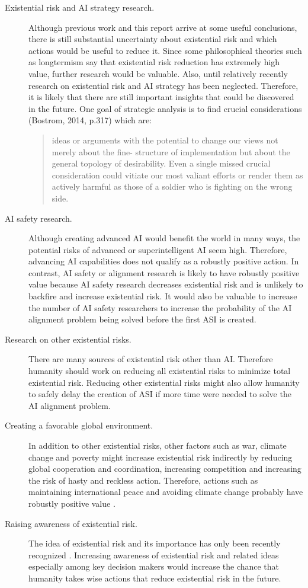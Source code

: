 \documentclass{article}
\begin{document}
\begin{description}
\item[Existential risk and AI strategy research.] Although previous work and this report arrive at some useful conclusions, there is still substantial uncertainty about existential risk and which actions would be useful to reduce it. Since some philosophical theories such as longtermism say that existential risk reduction has extremely high value, further research would be valuable. Also, until relatively recently research on existential risk and AI strategy has been neglected. Therefore, it is likely that there are still important insights that could be discovered in the future. One goal of strategic analysis is to find crucial considerations (Bostrom, 2014, p.317) which are:
\begin{quote}
ideas or arguments with the potential to change our views not merely about the fine-
structure of implementation but about the general topology of desirability. Even
a single missed crucial consideration could vitiate our most valiant efforts or render them as actively harmful as those of a soldier who is fighting on the wrong side.\cite{superintelligence}
\end{quote}
\item[AI safety research.] Although creating advanced AI would benefit the world in many ways, the potential risks of advanced or superintelligent AI seem high. Therefore, advancing AI capabilities does not qualify as a robustly positive action. In contrast, AI safety or alignment research is likely to have robustly positive value because AI safety research decreases existential risk and is unlikely to backfire and increase existential risk. It would also be valuable to increase the number of AI safety researchers to increase the probability of the AI alignment problem being solved before the first ASI is created.
\item[Research on other existential risks.] There are many sources of existential risk other than AI. Therefore humanity should work on reducing all existential risks to minimize total existential risk. Reducing other existential risks might also allow humanity to safely delay the creation of ASI if more time were needed to solve the AI alignment problem.
\item[Creating a favorable global environment.]In addition to other existential risks, other factors such as war, climate change and poverty might increase existential risk indirectly by reducing global cooperation and coordination, increasing competition and increasing the risk of hasty and reckless action. Therefore, actions such as maintaining international peace and avoiding climate change probably have robustly positive value \cite{theprecipice}.
\item[Raising awareness of existential risk.]The idea of existential risk and its importance has only been recently recognized \cite{existentialriskhistory}. Increasing awareness of existential risk and related ideas especially among key decision makers would increase the chance that humanity takes wise actions that reduce existential risk in the future.
\end{description}
\end{document}
